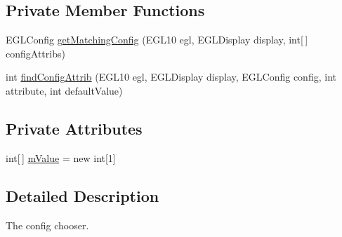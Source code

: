 \subsection*{\-Private \-Member \-Functions}
\begin{DoxyCompactItemize}
\item 
\-E\-G\-L\-Config \hyperlink{classsrdes_1_1menupp_1_1_q_c_a_r_sample_g_l_view_1_1_config_chooser_a86c41fd65258a39a78815a1567c4f607}{get\-Matching\-Config} (\-E\-G\-L10 egl, \-E\-G\-L\-Display display, int\mbox{[}$\,$\mbox{]} config\-Attribs)
\item 
int \hyperlink{classsrdes_1_1menupp_1_1_q_c_a_r_sample_g_l_view_1_1_config_chooser_a68ca075ee0b05204f54a19627ff5f63b}{find\-Config\-Attrib} (\-E\-G\-L10 egl, \-E\-G\-L\-Display display, \-E\-G\-L\-Config config, int attribute, int default\-Value)
\end{DoxyCompactItemize}
\subsection*{\-Private \-Attributes}
\begin{DoxyCompactItemize}
\item 
int\mbox{[}$\,$\mbox{]} \hyperlink{classsrdes_1_1menupp_1_1_q_c_a_r_sample_g_l_view_1_1_config_chooser_a6b3a613c507380ad15be00eb833800c9}{m\-Value} = new int\mbox{[}1\mbox{]}
\end{DoxyCompactItemize}


\subsection{\-Detailed \-Description}
\-The config chooser. 

